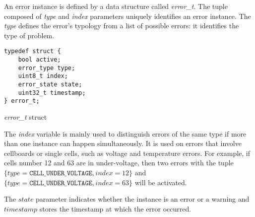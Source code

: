 An error instance is defined by a data structure called \textit{error\_t}. The tuple composed of \textit{type} and \textit{index} parameters uniquely identifies an error instance. The \textit{type} defines the error's typology from a list of possible errors: it identifies the type of problem.

\begin{listing}[h]
	\begin{verbatim}
typedef struct {
	bool active;
	error_type type;
	uint8_t index;
	error_state state;
	uint32_t timestamp;
} error_t;
	\end{verbatim}
	\caption{\textit{error\_t} struct}
	\label{code:error_t}
\end{listing}

The \textit{index} variable is mainly used to distinguish errors of the same type if more than one instance can happen simultaneously. It is used on errors that involve cellboards or single cells, such as voltage and temperature errors. For example, if cells number 12 and 63 are in under-voltage, then two errors with the tuple $\{\mathit{type} = \texttt{CELL\_UNDER\_VOLTAGE}, \mathit{index} = 12\}$ and $\{\mathit{type} = \texttt{CELL\_UNDER\_VOLTAGE}, \mathit{index} = 63\}$ will be activated.

The $\mathit{state}$ parameter indicates whether the instance is an error or a warning and $\mathit{timestamp}$ stores the timestamp at which the error occurred.

